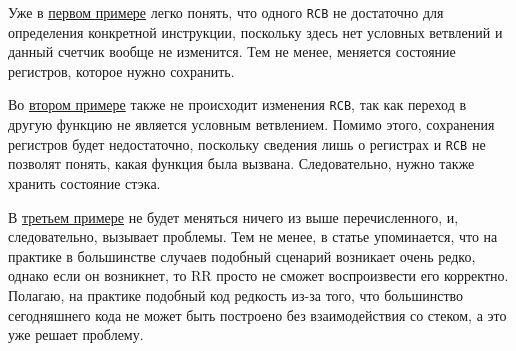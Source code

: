 Уже в \hyperref[lst:good-loop]{первом примере} легко понять, что одного \texttt{RCB} не достаточно для определения конкретной инструкции, 
поскольку здесь нет условных ветвлений и данный счетчик вообще не изменится. Тем не менее, меняется состояние регистров, которое нужно сохранить.

Во \hyperref[lst:multiple-calls]{втором примере} также не происходит изменения \texttt{RCB}, 
так как переход в другую функцию не является условным ветвлением.
Помимо этого, сохранения регистров будет недостаточно, поскольку сведения лишь о регистрах и \texttt{RCB} не позволят понять, какая функция была вызвана.
Следовательно, нужно также хранить состояние стэка.

В \hyperref[lst:bad-loop]{третьем примере} не будет меняться ничего из выше перечисленного, и, следовательно, вызывает проблемы. 
Тем не менее, в статье \cite{rr-paper} упоминается, что на практике в большинстве случаев подобный сценарий возникает очень редко, 
однако если он возникнет, то RR просто не сможет воспроизвести его корректно.
Полагаю, на практике подобный код редкость из-за того, что большинство сегодняшнего кода не может быть построено без взаимодействия со стеком, а это уже решает проблему.